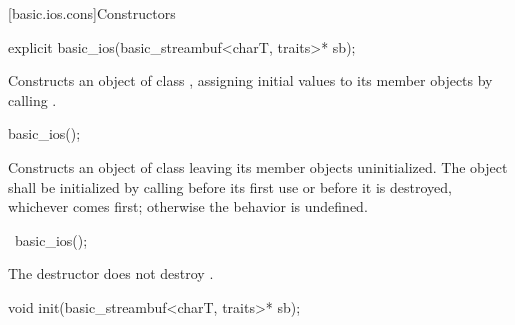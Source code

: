[basic.ios.cons]{Constructors}

%
\begin{itemdecl}
explicit basic_ios(basic_streambuf<charT, traits>* sb);
\end{itemdecl}

\begin{itemdescr}
\pnum
\effects
Constructs an object of class
,
assigning initial values to its member objects by calling
.
\end{itemdescr}

%
\begin{itemdecl}
basic_ios();
\end{itemdecl}

\begin{itemdescr}
\pnum
\effects
Constructs an object of class
leaving its member objects uninitialized. The object
shall be initialized by calling
before its first use or before it is destroyed, whichever comes first; otherwise the
behavior is undefined.
\end{itemdescr}

%
\begin{itemdecl}
~basic_ios();
\end{itemdecl}

\begin{itemdescr}
\pnum
\remarks
The destructor does not destroy
.
\end{itemdescr}

%
\begin{itemdecl}
void init(basic_streambuf<charT, traits>* sb);
\end{itemdecl}

